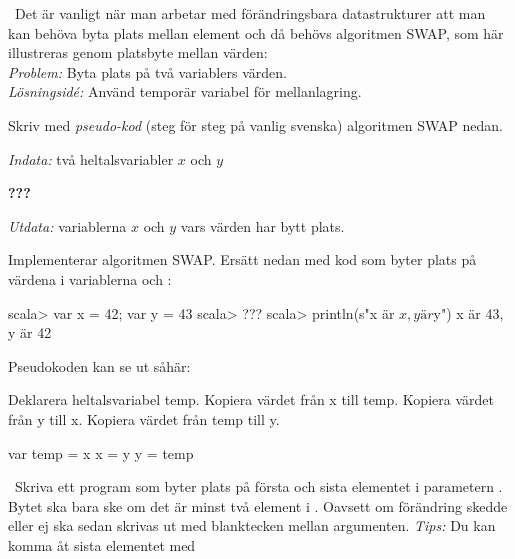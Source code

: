 
\QUESTBEGIN

\Task  \what~Det är vanligt när man arbetar med förändringsbara datastrukturer att man kan behöva byta plats mellan element och då behövs algoritmen SWAP, som här illustreras genom platsbyte mellan värden:
\\ \emph{Problem:} Byta plats på två variablers värden. \\\emph{Lösningsidé:} Använd temporär variabel för mellanlagring.

\Subtask Skriv med \emph{pseudo-kod} (steg för steg på vanlig svenska) algoritmen SWAP nedan.

\emph{Indata:} två heltalsvariabler $x$ och $y$

\textbf{???}

\emph{Utdata:} variablerna $x$ och $y$ vars värden har bytt plats.

\Subtask Implementerar algoritmen SWAP. Ersätt  nedan med kod som byter plats på värdena i variablerna  och :

\begin{REPL}
scala> var x = 42; var y = 43
scala> ???
scala> println(s"x är $x, y är $y") 
x är 43, y är 42
\end{REPL}

\SOLUTION

\TaskSolved \what

\SubtaskSolved  Pseudokoden kan se ut såhär:
\begin{Code}
Deklarera heltalsvariabel temp.
Kopiera värdet från x till temp.
Kopiera värdet från y till x.
Kopiera värdet från temp till y.
\end{Code}

\SubtaskSolved
\begin{Code}
var temp = x
x = y
y = temp
\end{Code}

\QUESTEND





\QUESTBEGIN

\Task \what~Skriva ett program som byter plats på första och sista elementet i parametern . Bytet ska bara ske om det är minst två element i . Oavsett om förändring skedde eller ej ska  sedan skrivas ut med blanktecken mellan argumenten.
  \emph{Tips:} Du kan komma åt sista elementet med 

